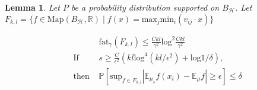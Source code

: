 \documentclass{jarticle}
\newtheorem{lem}[thm]{Lemma}
\begin{document}
\begin{lem}
\label{projvar}
  Let $P$ be a probability distribution supported on $B_{\mathcal{H}}$.
  Let $F_{k,l} = \{ f \in \mathrm{Map}(B_{\mathcal{H}},\mathbb{R}) \mid f(x)=\mathrm{max}_j \mathrm{min}_i(v_{ij} \cdot x) \}$

\begin{eqnarray*}
  & & \mathrm{fat}_{\gamma}(F_{k,l}) \le \frac{Ckl}{\gamma^2}\mathrm{log}^2 \frac{Ckl}{\gamma^2} \\
  &\mbox{If } & s \ge \frac{C}{\epsilon^2 }(kl \mathrm{log}^4(kl/\epsilon^2)+ \mathrm{log}{1/\delta}), \\
  &\mbox{then } & \mathbb{P}[\mathrm{sup}_{f \in F_{k,l}}| \mathbb{E}_{\mu_s}f(x_i) - \mathbb{E}_{\mu}f| \ge \epsilon ] \le \delta
\end{eqnarray*}
\end{lem}
\end{document}
